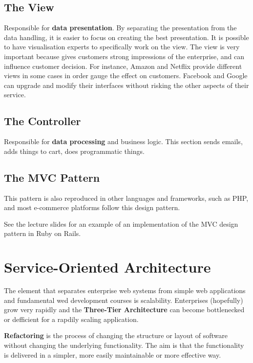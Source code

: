 \documentclass[11pt]{article}
\begin{document}
\subsection{The View}
Responsible for \textbf{data presentation}. By separating the presentation from the data handling, it is easier to focus on creating the best presentation. It is possible to have visualisation experts to specifically work on the view. The view is very important because gives customers strong impressions of the enterprise, and can influence customer decision. For instance, Amazon and Netflix provide different views in some cases in order gauge the effect on customers. Facebook and Google can upgrade and modify their interfaces without risking the other aspects of their service.

\subsection{The Controller}
Responsible for \textbf{data processing} and business logic. This section sends emails, adds things to cart, does programmatic things.

\subsection{The MVC Pattern}
This pattern is also reproduced in other languages and frameworks, such as PHP, and most e-commerce platforms follow this design pattern.

See the lecture slides for an example of an implementation of the MVC design pattern in Ruby on Rails.




\section{Service-Oriented Architecture}
\label{sec:SOA}

The element that separates enterprise web systems from simple web applications and fundamental wed development courses is scalability. Enterprises (hopefully) grow very rapidly and the \textbf{Three-Tier Architecture} can become bottlenecked or defficient for a rapdily scaling application.

\textbf{Refactoring} is the process of changing the structure or layout of software without changing the underlying functionality. The aim is that the functionality is delivered in a simpler, more easily maintainable or more effective way.
\end{document}

